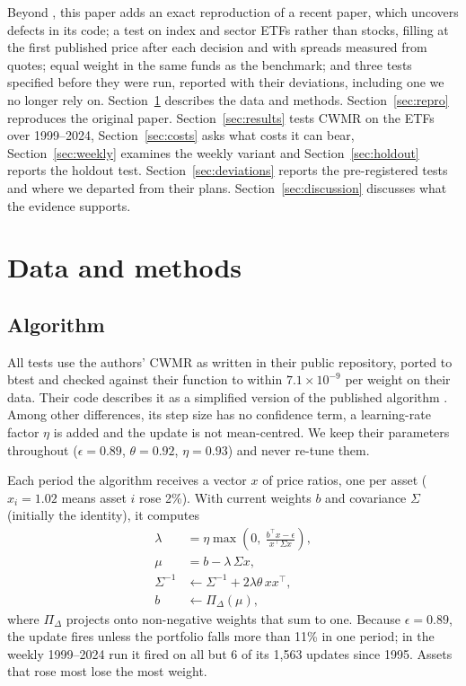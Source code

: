 \documentclass[11pt]{article}
\begin{document}
Beyond \citet{moon2019}, this paper adds an exact reproduction of a recent paper, which
uncovers defects in its code; a test on index and sector ETFs rather than stocks, filling at the
first published price after each decision and with spreads measured from quotes; equal weight in the same funds as
the benchmark; and three tests specified before they were run, reported with their deviations,
including one we no longer rely on.
Section~\ref{sec:data}
describes the data and methods. Section~\ref{sec:repro} reproduces the original paper.
Section~\ref{sec:results} tests CWMR on the ETFs over 1999--2024, Section~\ref{sec:costs}
asks what costs it can bear, Section~\ref{sec:weekly} examines the weekly variant and
Section~\ref{sec:holdout} reports the holdout test.
Section~\ref{sec:deviations} reports the pre-registered tests and where we departed from their
plans.
Section~\ref{sec:discussion}
discusses what the evidence supports.

\section{Data and methods}\label{sec:data}

\subsection{Algorithm}

All tests use the authors' CWMR as written in their public repository, ported
to btest and checked against their function to within $7.1\times10^{-9}$ per weight on their
data. Their code describes it as a simplified version of the published algorithm
\citep{li2011cwmr,li2013cwmr}. Among other differences, its step size has no confidence term, a
learning-rate factor $\eta$ is added and the update is not mean-centred.
We keep their parameters throughout ($\epsilon = 0.89$, $\theta = 0.92$, $\eta = 0.93$) and
never re-tune them.

Each period the algorithm receives a vector $x$ of price ratios, one per asset ($x_i = 1.02$
means asset $i$ rose 2\%). With current weights $b$ and covariance $\Sigma$ (initially the
identity), it computes
\begin{align}
  \lambda &= \eta \max\!\left(0,\ \frac{b^\top x - \epsilon}{x^\top \Sigma x}\right), \\
  \mu &= b - \lambda\, \Sigma x, \\
  \Sigma^{-1} &\leftarrow \Sigma^{-1} + 2 \lambda \theta\, x x^\top, \\
  b &\leftarrow \Pi_\Delta(\mu),
\end{align}
where $\Pi_\Delta$ projects onto non-negative weights that sum to one. Because $\epsilon = 0.89$,
the update fires unless the portfolio falls more than 11\% in one period; in the weekly
1999--2024 run it fired on all but 6 of its 1,563 updates since 1995. Assets that rose most lose the most weight.
\end{document}
